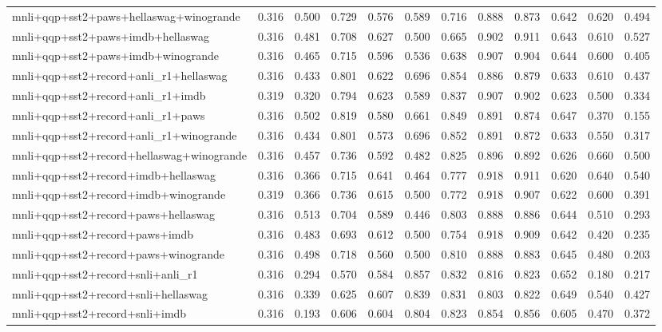 \begin{table}[t]
\begin{tabular}{lrrrrrrrrrrr}
    mnli+qqp+sst2+paws+hellaswag+winogrande & 0.316 & 0.500 & 0.729 & 0.576 & 0.589 & 0.716 & 0.888 & 0.873 & 0.642 & 0.620 & 0.494 \\
    mnli+qqp+sst2+paws+imdb+hellaswag & 0.316 & 0.481 & 0.708 & 0.627 & 0.500 & 0.665 & 0.902 & 0.911 & 0.643 & 0.610 & 0.527 \\
    mnli+qqp+sst2+paws+imdb+winogrande & 0.316 & 0.465 & 0.715 & 0.596 & 0.536 & 0.638 & 0.907 & 0.904 & 0.644 & 0.600 & 0.405 \\
    mnli+qqp+sst2+record+anli\_r1+hellaswag & 0.316 & 0.433 & 0.801 & 0.622 & 0.696 & 0.854 & 0.886 & 0.879 & 0.633 & 0.610 & 0.437 \\
    mnli+qqp+sst2+record+anli\_r1+imdb & 0.319 & 0.320 & 0.794 & 0.623 & 0.589 & 0.837 & 0.907 & 0.902 & 0.623 & 0.500 & 0.334 \\
    mnli+qqp+sst2+record+anli\_r1+paws & 0.316 & 0.502 & 0.819 & 0.580 & 0.661 & 0.849 & 0.891 & 0.874 & 0.647 & 0.370 & 0.155 \\
    mnli+qqp+sst2+record+anli\_r1+winogrande & 0.316 & 0.434 & 0.801 & 0.573 & 0.696 & 0.852 & 0.891 & 0.872 & 0.633 & 0.550 & 0.317 \\
    mnli+qqp+sst2+record+hellaswag+winogrande & 0.316 & 0.457 & 0.736 & 0.592 & 0.482 & 0.825 & 0.896 & 0.892 & 0.626 & 0.660 & 0.500 \\
    mnli+qqp+sst2+record+imdb+hellaswag & 0.316 & 0.366 & 0.715 & 0.641 & 0.464 & 0.777 & 0.918 & 0.911 & 0.620 & 0.640 & 0.540 \\
    mnli+qqp+sst2+record+imdb+winogrande & 0.319 & 0.366 & 0.736 & 0.615 & 0.500 & 0.772 & 0.918 & 0.907 & 0.622 & 0.600 & 0.391 \\
    mnli+qqp+sst2+record+paws+hellaswag & 0.316 & 0.513 & 0.704 & 0.589 & 0.446 & 0.803 & 0.888 & 0.886 & 0.644 & 0.510 & 0.293 \\
    mnli+qqp+sst2+record+paws+imdb & 0.316 & 0.483 & 0.693 & 0.612 & 0.500 & 0.754 & 0.918 & 0.909 & 0.642 & 0.420 & 0.235 \\
    mnli+qqp+sst2+record+paws+winogrande & 0.316 & 0.498 & 0.718 & 0.560 & 0.500 & 0.810 & 0.888 & 0.883 & 0.645 & 0.480 & 0.203 \\
    mnli+qqp+sst2+record+snli+anli\_r1 & 0.316 & 0.294 & 0.570 & 0.584 & 0.857 & 0.832 & 0.816 & 0.823 & 0.652 & 0.180 & 0.217 \\
    mnli+qqp+sst2+record+snli+hellaswag & 0.316 & 0.339 & 0.625 & 0.607 & 0.839 & 0.831 & 0.803 & 0.822 & 0.649 & 0.540 & 0.427 \\
    mnli+qqp+sst2+record+snli+imdb & 0.316 & 0.193 & 0.606 & 0.604 & 0.804 & 0.823 & 0.854 & 0.856 & 0.605 & 0.470 & 0.372 \\

\end{tabular}
\end{table}
